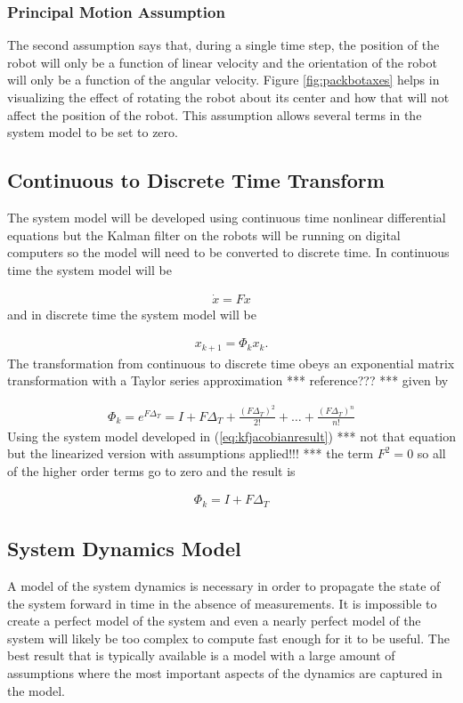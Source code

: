 \subsubsection{Principal Motion Assumption}
\label{sec:kfPrincipalMotionAssumption}
The second assumption says that, during a single time step, the position of the robot will only be a function of linear velocity and the orientation of the robot will only be a function of the angular velocity. Figure \ref{fig:packbotaxes} helps in visualizing the effect of rotating the robot about its center and how that will not affect the position of the robot. This assumption allows several terms in the system model to be set to zero.

\subsection{Continuous to Discrete Time Transform}
\label{sec:kfContToDiscTransform}
The system model will be developed using continuous time nonlinear differential equations but the Kalman filter on the robots will be running on digital computers so the model will need to be converted to discrete time. In continuous time the system model will be

\begin{align*}
\dot{x} = Fx
\end{align*}
and in discrete time the system model will be

\begin{align*}
x_{k+1} = \Phi_k x_k.
\end{align*}
The transformation from continuous to discrete time obeys an exponential matrix transformation with a Taylor series approximation *** reference??? *** given by

\begin{align*}
\Phi_k = e^{F\Delta_T} = I + F\Delta_T + \frac{(F\Delta_T)^2}{2!} + \ldots + \frac{(F\Delta_T)^n}{n!}
\end{align*}
Using the system model developed in (\ref{eq:kfjacobianresult}) *** not that equation but the linearized version with assumptions applied!!! *** the term $F^2=0$ so all of the higher order terms go to zero and the result is

\begin{align}
\label{eq:kfContToDiscTransform}
\Phi_k = I + F\Delta_T
\end{align}

\subsection{System Dynamics Model}
\label{sec:dynamics}
A model of the system dynamics is necessary in order to propagate the state of the system forward in time in the absence of measurements. It is impossible to create a perfect model of the system and even a nearly perfect model of the system will likely be too complex to compute fast enough for it to be useful. The best result that is typically available is a model with a large amount of assumptions where the most important aspects of the dynamics are captured in the model.

